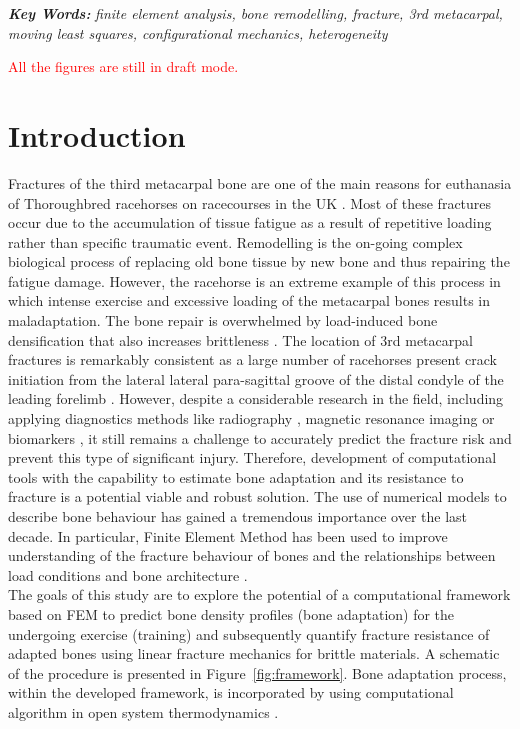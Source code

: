 \documentclass[11pt]{acmeArticle}
\numberwithin{equation}{section}
\begin{document}
{\textbf{\textit{Key Words:}} {\it finite element analysis, bone remodelling, fracture, 3rd metacarpal, moving least squares, configurational mechanics, heterogeneity}}
%
\\
\newpage

\textcolor{red}{All the figures are still in draft mode.}
\section{Introduction}
Fractures of the third metacarpal bone are one of the main reasons for euthanasia of Thoroughbred racehorses on racecourses in the UK \citep{Parkin2004risk}.
Most of these fractures occur due to the accumulation of tissue fatigue as a result of repetitive loading \citep{Parkin2005} rather than specific traumatic event.
Remodelling is the on-going complex biological process of replacing old bone tissue by new bone and thus repairing the fatigue damage\citep{hughes2017role}.
However, the racehorse is an extreme example of this process in which intense exercise and excessive loading of the metacarpal bones results in maladaptation.
The bone repair is overwhelmed by load-induced bone densification that also increases brittleness \citep{loughridge2017qualitative}.
The location of 3rd metacarpal fractures is remarkably consistent as a large number of racehorses present crack initiation from 
the lateral lateral para-sagittal groove of the distal condyle of the leading forelimb \citep{jacklin2012frequency, parkin2006analysis}.
However, despite a considerable research in the field, including applying diagnostics methods like radiography 
\citep{bogers2016quantitative, crijns2014intramodality, loughridge2017qualitative}, magnetic resonance imaging 
\citep{tranquille2017MRI} or biomarkers \citep{mcilwraith2005use}, it still remains a challenge to accurately predict the fracture risk 
and prevent this type of significant injury.
Therefore, development of computational tools with the capability to estimate bone adaptation and its resistance to fracture is a potential 
viable and robust solution.
The use of numerical models to describe bone behaviour has gained a tremendous importance over the last decade. 
In particular, Finite Element Method has been used to improve understanding of the fracture behaviour of bones and the relationships between load conditions and bone architecture \citep{podshivalov2014road, poelert2013patient}. \\
The goals of this study are to explore the potential of a computational framework based on FEM to predict bone density profiles 
(bone adaptation) for the undergoing exercise (training) and subsequently quantify fracture resistance of 
adapted bones using linear fracture mechanics for brittle materials. 
A schematic of the procedure is presented in Figure~\ref{fig:framework}.
Bone adaptation process, within the developed framework, is incorporated by using computational algorithm in open system thermodynamics 
\citep{Kuhl2003a}.
\end{document}
